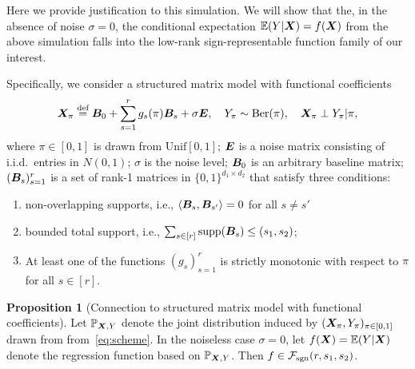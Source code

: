 \documentclass[11pt]{article}
\theoremstyle{plain}
\theoremstyle{definition}
\newtheorem{prop}{Proposition}
\def\caliF{\tF_{\textup{sgn}}}
\def\supp{\textup{supp}}
\def\caliF{\tF_{\textup{sgn}}}
\begin{document}
Here we provide justification to this simulation. We will show that the, in the absence of noise $\sigma=0$, the conditional expectation $\mathbb{E}(Y|\bm X)=f(\bm X)$ from the above simulation falls into the low-rank sign-representable function family of our interest. 


Specifically, we consider a structured matrix model with functional coefficients
\begin{equation}\label{eq:scheme}
\bm X_\pi\stackrel{\text{def}}{=}\bm B_0+ \sum_{s=1}^rg_s(\pi)\bm B_s+\sigma \bm{E},\quad Y_\pi\sim\text{Ber}(\pi),\quad \bm X_\pi \perp Y_\pi |\pi,
\end{equation}
where $\pi \in[0,1]$ is drawn from $\text{Unif}[0,1]$; $\bm{E}$ is a noise matrix consisting of i.i.d.\ entries in $N(0,1)$; $\sigma$ is the noise level; $\bm B_0$ is an arbitrary baseline matrix; $(\bm B_s)_{s=1}^r$ is a set of rank-1 matrices in $\{0,1\}^{d_1\times d_2}$ that satisfy three conditions:
\begin{enumerate}
\item non-overlapping supports, i.e., $\langle \bm B_s, \bm B_{s'}\rangle=0$ for all $s\neq s'$
\item bounded total support, i.e., $\sum_{s\in[r]}\supp(\mB_s)\leq (s_1,s_2)$;
\item At least one of the functions $(g_s)_{s=1}^r$ is strictly monotonic with respect to $\pi$ for all $s\in[r]$. \\
\end{enumerate}

\begin{prop}[Connection to structured matrix model with functional coefficients] Let $\mathbb{P}_{\bm X,Y}$ denote the joint distribution induced by $(\bm X_\pi,Y_\pi)_{\pi\in[0,1]}$ drawn from from~\eqref{eq:scheme}. In the noiseless case $\sigma = 0$, let $f(\bm X)=\mathbb{E}(Y|\bm X)$ denote the regression function based on $\mathbb{P}_{\bm X,Y}$. Then $f\in\caliF(r,s_1,s_2)$.
\end{prop}
\end{document}
